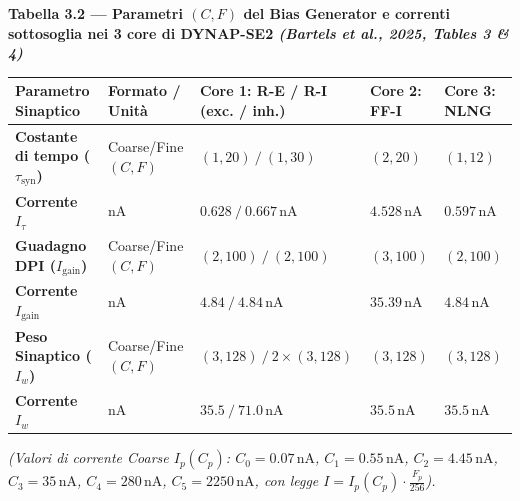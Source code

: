 \documentclass[11pt,a4paper]{article}
\begin{document}
\textbf{Tabella 3.2 --- Parametri $(C, F)$ del Bias Generator e correnti sottosoglia nei 3 core di DYNAP-SE2 \textit{(Bartels et al., 2025, Tables 3 \& 4)}}

\begin{center}
\scriptsize
\renewcommand{\arraystretch}{1.3}
\begin{tabularx}{\textwidth}{|>{\raggedright\arraybackslash}X|>{\raggedright\arraybackslash}X|>{\raggedright\arraybackslash}X|>{\raggedright\arraybackslash}X|>{\raggedright\arraybackslash}X|}
\hline
\textbf{Parametro Sinaptico} & \textbf{Formato / Unità} & \textbf{Core 1: R-E / R-I (exc. / inh.)} & \textbf{Core 2: FF-I} & \textbf{Core 3: NLNG} \\ \hline \hline
\textbf{Costante di tempo ($\tau_{\text{syn}}$)} & Coarse/Fine $(C, F)$ & $(1, 20)\ /\ (1, 30)$ & $(2, 20)$ & $(1, 12)$ \\ \hline
\textbf{Corrente $I_\tau$} & $\text{nA}$ & $0.628\ /\ 0.667\,\text{nA}$ & $4.528\,\text{nA}$ & $0.597\,\text{nA}$ \\ \hline
\textbf{Guadagno DPI ($I_{\text{gain}}$)} & Coarse/Fine $(C, F)$ & $(2, 100)\ /\ (2, 100)$ & $(3, 100)$ & $(2, 100)$ \\ \hline
\textbf{Corrente $I_{\text{gain}}$} & $\text{nA}$ & $4.84\ /\ 4.84\,\text{nA}$ & $35.39\,\text{nA}$ & $4.84\,\text{nA}$ \\ \hline
\textbf{Peso Sinaptico ($I_w$)} & Coarse/Fine $(C, F)$ & $(3, 128)\ /\ 2\times(3, 128)$ & $(3, 128)$ & $(3, 128)$ \\ \hline
\textbf{Corrente $I_w$} & $\text{nA}$ & $35.5\ /\ 71.0\,\text{nA}$ & $35.5\,\text{nA}$ & $35.5\,\text{nA}$ \\ \hline
\end{tabularx}
\end{center}
\normalsize

\textit{(Valori di corrente Coarse $I_p(C_p)$: $C_0 = 0.07\,\text{nA}$, $C_1 = 0.55\,\text{nA}$, $C_2 = 4.45\,\text{nA}$, $C_3 = 35\,\text{nA}$, $C_4 = 280\,\text{nA}$, $C_5 = 2250\,\text{nA}$, con legge $I = I_p(C_p) \cdot \frac{F_p}{256}$).}
\end{document}
